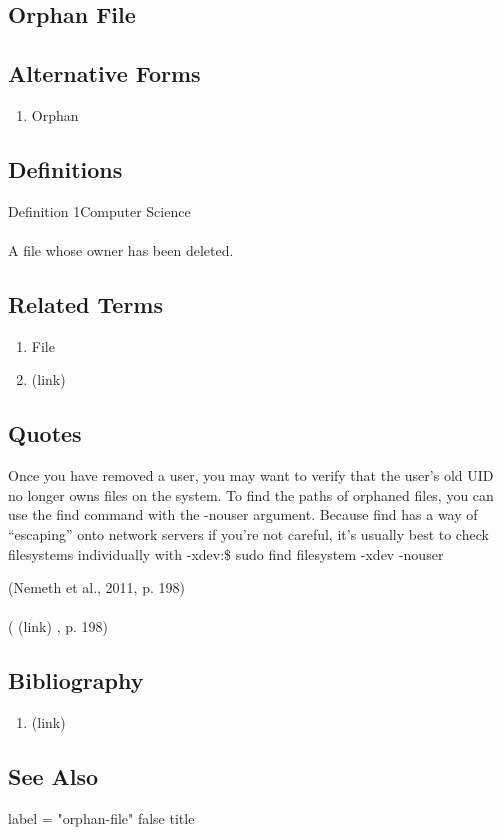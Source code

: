 \newpage \subsection*{Orphan File } \subsection*{Alternative Forms } \begin{enumerate} \item  Orphan  \end{enumerate} \subsection*{Definitions } \begin{DIC_Def}{Definition 1Computer Science }{} \paragraph{} A file whose owner has been deleted.  \end{DIC_Def} \subsection*{Related Terms } \begin{enumerate} \item  File  \item  (link) \href{Orphan (Dictionary Entry) }{ }   \end{enumerate} \subsection*{Quotes } \begin{DIC_BlockQuote} Once you have removed a user, you may want to verify that the user's old UID no longer owns files on the system. To find the paths of orphaned files, you can use the find command with the -nouser argument. Because find has a way of ``escaping'' onto network servers if you're not careful, it's usually best to check filesystems individually with -xdev:\$ sudo find filesystem -xdev -nouser  \end{DIC_BlockQuote} (Nemeth et al., 2011, p. 198)  \paragraph{} (  (link) \href{Nemeth et al., 2011 }{ } , p. 198)  \subsection*{Bibliography } \begin{enumerate} \item  (link) \href{Nemeth et al., 2011 }{ }   \end{enumerate} \subsection*{See Also } label = "orphan-file"  false  title  